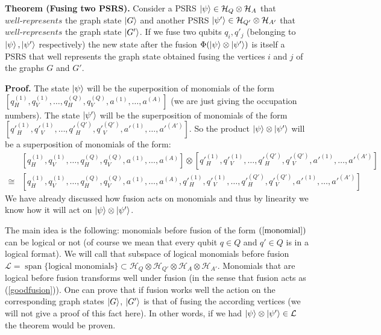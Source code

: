 \documentclass{article}
\DeclareMathOperator{\spn}{span}
\begin{document}
\textbf{Theorem (Fusing two PSRS).} Consider a PSRS $\ket{\psi} \in \mathcal{H}_{Q} \otimes \mathcal{H}_{A}$ that $\textit{well-represents}$ the graph state $\ket{G}$ and another PSRS $\ket{\psi'} \in \mathcal{H}_{Q'} \otimes \mathcal{H}_{A'}$ that $\textit{well-represents}$ the graph state $\ket{G'}$. If we fuse two qubits $q_i, q'_j$ (belonging to $\ket{\psi}, \ket{\psi'}$ respectively) the new state after the fusion $\Phi(\ket{\psi}\otimes\ket{\psi'})$ is itself a PSRS that well represents the graph state obtained fusing the vertices $i$ and $j$ of the graphs $G$ and $G'$.

\textbf{Proof.} The state $\ket{\psi}$ will be the superposition of monomials of the form $[q^{(1)}_H, q^{(1)}_V, \dots, q^{(Q)}_H, q^{(Q)}_V, a^{(1)}, \dots, a^{(A)}]$ (we are just giving the occupation numbers). The state $\ket{\psi'}$ will be the superposition of monomials of the form \\ $[q'^{(1)}_H, q'^{(1)}_V, \dots, q'^{(Q')}_H, q'^{(Q')}_V, a'^{(1)}, \dots, a'^{(A')}]$. So the product $\ket{\psi} \otimes \ket{\psi'}$ will be a superposition of monomials of the form:
\begin{align}
\label{monomial}
\nonumber
&[q^{(1)}_H, q^{(1)}_V, \dots, q^{(Q)}_H, q^{(Q)}_V, a^{(1)}, \dots, a^{(A)}] \otimes [q'^{(1)}_H, q'^{(1)}_V, \dots, q'^{(Q')}_H, q'^{(Q')}_V, a'^{(1)}, \dots, a'^{(A')}] \\ \cong
&[q^{(1)}_H, q^{(1)}_V, \dots, q^{(Q)}_H, q^{(Q)}_V, a^{(1)}, \dots, a^{(A)}, q'^{(1)}_H, q'^{(1)}_V, \dots, q'^{(Q')}_H, q'^{(Q')}_V, a'^{(1)}, \dots, a'^{(A')}]
\end{align}
We have already discussed how fusion acts on monomials and thus by linearity we know how it will act on $\ket{\psi} \otimes \ket{\psi'}$.

The main idea is the following: monomials before fusion of the  form $(\ref{monomial})$ can be logical or not (of course we mean that every qubit $q \in Q$ and $q' \in Q$ is in a logical format). We will call that subspace of logical monomials before fusion $\mathcal{L} = \spn\{\text{logical monomials}\} \subset \mathcal{H}_{Q} \otimes\mathcal{H}_{Q'} \otimes\mathcal{H}_A \otimes\mathcal{H}_{A'}$. Monomials that are logical before fusion transforms well under fusion (in the sense that fusion acts as (\ref{goodfusion})). One can prove that if fusion works well the action on the corresponding graph states $\ket{G}$, $\ket{G'}$ is that of fusing the according vertices (we will not give a proof of this fact here). In other words, if we had $\ket{\psi} \otimes \ket{\psi'} \in \mathcal{L}$ the theorem would be proven.
\end{document}
